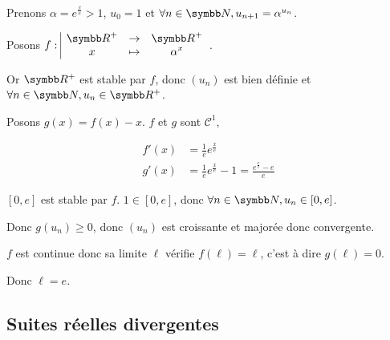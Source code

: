 \begin{exemple}
    Prenons $\alpha = e^{\frac x e} > 1$, $u_0 = 1$ et $\forall n \in \N, u_{n + 1} = \alpha^{u_n}$.

    Posons $\fonction{f}{\R^+}{\R^+}{x}{\alpha^x}$.

    Or $\R^+$ est stable par $f$, donc $(u_n)$ est bien définie et $\forall n \in \N, u_n \in \R^+$.

    Posons $g(x) = f(x) - x$. 
    $f$ et $g$ sont $\mathscr C^1$, 

    \begin{align*}
        f'(x) &=  \frac 1 e e^{\frac x e} \\
        g'(x) &=  \frac 1 e e^{\frac x e} - 1 = \frac{e^{\frac x e} - e}{e}
    \end{align*}


    \begin{center}
    \end{center}

    $[0, e]$ est stable par $f$. $1 \in [0, e]$, donc $\forall n \in \N, u_n \in [0, e]$.

    Donc $g(u_n) \geqslant 0$, donc $(u_n)$ est croissante et majorée donc convergente. 

    $f$ est continue donc sa limite $\ell$ vérifie $f(\ell) = \ell$, c'est à dire 
    $g(\ell) = 0$.

    Donc $\ell = e$.
\end{exemple}

\subsection{Suites réelles divergentes}

